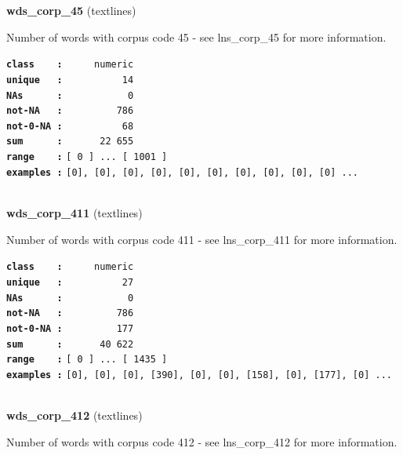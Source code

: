 \documentclass[]{article}
\begin{document}
\textbf{wds\_corp\_45} (textlines)

Number of words with corpus code 45 - see lns\_corp\_45 for more
information.

\textbf{\texttt{class\ \ \ \ :}} \texttt{~~~~~numeric}\\
\textbf{\texttt{unique\ \ \ :}} \texttt{~~~~~~~~~~14}\\
\textbf{\texttt{NAs\ \ \ \ \ \ :}} \texttt{~~~~~~~~~~~0}\\
\textbf{\texttt{not-NA\ \ \ :}} \texttt{~~~~~~~~~786}\\
\textbf{\texttt{not-0-NA\ :}} \texttt{~~~~~~~~~~68}\\
\textbf{\texttt{sum\ \ \ \ \ \ :}} \texttt{~~~~~~22~655}\\
\textbf{\texttt{range\ \ \ \ :}}
\texttt{{[}\ 0\ {]}\ ...\ {[}\ 1001\ {]}}\\
\textbf{\texttt{examples\ :}}
\texttt{{[}0{]},\ {[}0{]},\ {[}0{]},\ {[}0{]},\ {[}0{]},\ {[}0{]},\ {[}0{]},\ {[}0{]},\ {[}0{]},\ {[}0{]}\ ...}\\

~

\textbf{wds\_corp\_411} (textlines)

Number of words with corpus code 411 - see lns\_corp\_411 for more
information.

\textbf{\texttt{class\ \ \ \ :}} \texttt{~~~~~numeric}\\
\textbf{\texttt{unique\ \ \ :}} \texttt{~~~~~~~~~~27}\\
\textbf{\texttt{NAs\ \ \ \ \ \ :}} \texttt{~~~~~~~~~~~0}\\
\textbf{\texttt{not-NA\ \ \ :}} \texttt{~~~~~~~~~786}\\
\textbf{\texttt{not-0-NA\ :}} \texttt{~~~~~~~~~177}\\
\textbf{\texttt{sum\ \ \ \ \ \ :}} \texttt{~~~~~~40~622}\\
\textbf{\texttt{range\ \ \ \ :}}
\texttt{{[}\ 0\ {]}\ ...\ {[}\ 1435\ {]}}\\
\textbf{\texttt{examples\ :}}
\texttt{{[}0{]},\ {[}0{]},\ {[}0{]},\ {[}390{]},\ {[}0{]},\ {[}0{]},\ {[}158{]},\ {[}0{]},\ {[}177{]},\ {[}0{]}\ ...}\\

~

\textbf{wds\_corp\_412} (textlines)

Number of words with corpus code 412 - see lns\_corp\_412 for more
information.
\end{document}

